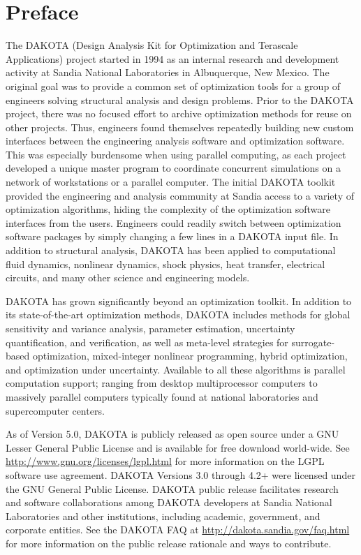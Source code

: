 \chapter*{Preface}

The DAKOTA (Design Analysis Kit for Optimization and Terascale
Applications) project started in 1994 as an internal research and
development activity at Sandia National Laboratories in Albuquerque,
New Mexico. The original goal was to provide a common set of
optimization tools for a group of engineers solving structural
analysis and design problems. Prior to the DAKOTA project, there was
no focused effort to archive optimization methods for reuse on other
projects. Thus, engineers found themselves repeatedly building new
custom interfaces between the engineering analysis software and
optimization software. This was especially burdensome when using
parallel computing, as each project developed a unique master program
to coordinate concurrent simulations on a network of workstations or a
parallel computer. The initial DAKOTA toolkit provided the engineering
and analysis community at Sandia access to a variety of optimization
algorithms, hiding the complexity of the optimization software
interfaces from the users. Engineers could readily switch between
optimization software packages by simply changing a few lines in a
DAKOTA input file. In addition to structural analysis, DAKOTA has been
applied to computational fluid dynamics, nonlinear dynamics, shock
physics, heat transfer, electrical circuits, and many other science
and engineering models.

DAKOTA has grown significantly beyond an optimization toolkit.  In
addition to its state-of-the-art optimization methods, DAKOTA includes
methods for global sensitivity and variance analysis, parameter
estimation, uncertainty quantification, and verification, as well as
meta-level strategies for surrogate-based optimization, mixed-integer
nonlinear programming, hybrid optimization, and optimization under
uncertainty. Available to all these algorithms is parallel computation
support; ranging from desktop multiprocessor computers to massively
parallel computers typically found at national laboratories and
supercomputer centers.

As of Version 5.0, DAKOTA is publicly released as open source under a
GNU Lesser General Public License and is available for free download
world-wide.  See \url{http://www.gnu.org/licenses/lgpl.html} for more
information on the LGPL software use agreement.  DAKOTA Versions 3.0
through 4.2+ were licensed under the GNU General Public License.
DAKOTA public release facilitates research and software collaborations
among DAKOTA developers at Sandia National Laboratories and other
institutions, including academic, government, and corporate
entities. See the DAKOTA FAQ at
\url{http://dakota.sandia.gov/faq.html} for more information on the
public release rationale and ways to contribute.

